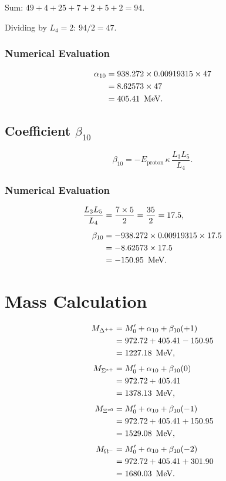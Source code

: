 Sum: \(49 + 4 + 25 + 7 + 2 + 5 + 2 = 94\).

Dividing by \(L_4 = 2\): \(94/2 = 47\).

\subsubsection{Numerical Evaluation}

\[
\begin{aligned}
\alpha_{10} &= 938.272 \times 0.00919315 \times 47 \\
            &= 8.62573 \times 47 \\
            &= 405.41\ \,\text{MeV}.
\end{aligned}
\]

\subsection{Coefficient \(\beta_{10}\)}

\begin{equation}
\beta_{10} = -E_{\text{proton}}\,\kappa\,
\frac{L_3 L_5}{L_4}.
\label{eq:beta10}
\end{equation}

\subsubsection{Numerical Evaluation}

\[
\begin{aligned}
\frac{L_3 L_5}{L_4} &= \frac{7 \times 5}{2} = \frac{35}{2} = 17.5, \\[4pt]
\beta_{10} &= -938.272 \times 0.00919315 \times 17.5 \\
           &= -8.62573 \times 17.5 \\
           &= -150.95\ \,\text{MeV}.
\end{aligned}
\]

\section{Mass Calculation}

\[
\begin{aligned}
M_{\Delta^{++}} &= M_0' + \alpha_{10} + \beta_{10}(+1) \\
                &= 972.72 + 405.41 - 150.95 \\
                &= 1227.18\ \,\text{MeV}, \\[4pt]
M_{\Sigma^{*+}} &= M_0' + \alpha_{10} + \beta_{10}(0) \\
                &= 972.72 + 405.41 \\
                &= 1378.13\ \,\text{MeV}, \\[4pt]
M_{\Xi^{*0}} &= M_0' + \alpha_{10} + \beta_{10}(-1) \\
             &= 972.72 + 405.41 + 150.95 \\
             &= 1529.08\ \,\text{MeV}, \\[4pt]
M_{\Omega^-} &= M_0' + \alpha_{10} + \beta_{10}(-2) \\
             &= 972.72 + 405.41 + 301.90 \\
             &= 1680.03\ \,\text{MeV}.
\end{aligned}
\]

